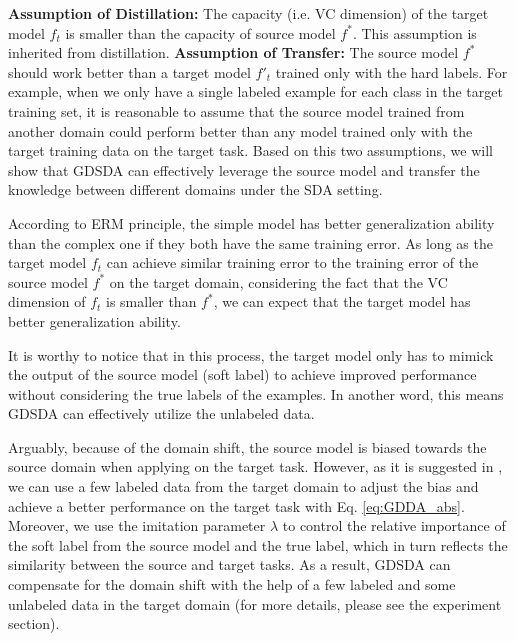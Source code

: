 \textbf{Assumption of Distillation:} The capacity (i.e. VC dimension) of the target model $f_t$ is smaller than the capacity of source model $f^*$. This assumption is inherited from distillation.
\textbf{Assumption of Transfer:} The source model $f^*$ should work better than a target model $f'_t$ trained only with the hard labels. For example, when we only have a single labeled example for each class in the target training set, it is reasonable to assume that the source model trained from another domain could perform better than any model trained only with the target training data on the target task. Based on this two assumptions, we will show that GDSDA can effectively leverage the source model and transfer the knowledge between different domains under the SDA setting.

According to ERM principle\cite{vapnik1999overview}, the simple model has better generalization ability than the complex one if they both have the same training error.
As long as the target model $f_t$ can achieve similar training error to the training error of the source model $f^*$ on the target domain, considering the fact that the VC dimension of $f_t$ is smaller than $f^*$, we can expect that the target model has better generalization ability. 

It is worthy to notice that in this process, the target model only has to mimick the output of the source model (soft label) to achieve improved performance without considering the true labels of the examples. In another word, this means GDSDA can effectively utilize the unlabeled data.

Arguably, because of the domain shift, the source model is biased towards the source domain when applying on the target task. However, as it is suggested in \cite{hinton2015distilling}, we can use a few labeled data from the target domain to adjust the bias and achieve a better performance on the target task with Eq. \eqref{eq:GDDA_abs}. Moreover, we use the imitation parameter $\lambda$ to control the relative importance of the soft label from the source model and the true label, which in turn reflects the similarity between the source and target tasks. As a result, GDSDA can compensate for the domain shift with the help of a few labeled and some unlabeled data in the target domain (for more details, please see the experiment section).

